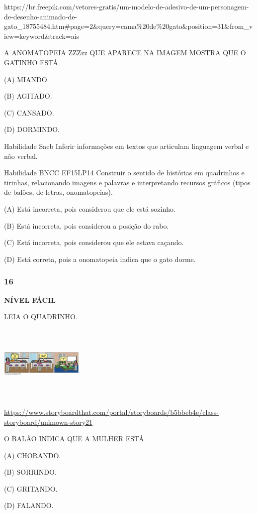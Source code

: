 https://br.freepik.com/vetores-gratis/um-modelo-de-adesivo-de-um-personagem-de-desenho-animado-de-gato\_18755484.htm\#page=2\&query=cama\%20de\%20gato\&position=31\&from\_view=keyword\&track=ais

A ANOMATOPEIA ZZZzz QUE APARECE NA IMAGEM MOSTRA QUE O GATINHO ESTÁ

(A) MIANDO.

(B) AGITADO.

(C) CANSADO.

(D) DORMINDO.

Habilidade Saeb Inferir informações em textos que articulam linguagem
verbal e não verbal.

Habilidade BNCC EF15LP14 Construir o sentido de histórias em quadrinhos
e tirinhas, relacionando imagens e palavras e interpretando recursos
gráficos (tipos de balões, de letras, onomatopeias).

(A) Está incorreta, pois considerou que ele está sozinho.

(B) Está incorreta, pois considerou a posição do rabo.

(C) Está incorreta, pois considerou que ele estava caçando.

(D) Está correta, pois a onomatopeia indica que o gato dorme.

\subsubsection{16}\label{section-126}

\textbf{NÍVEL FÁCIL}

LEIA O QUADRINHO.

\includegraphics[width=1.57333in,height=1.45456in]{media/image162.png}

\url{https://www.storyboardthat.com/portal/storyboards/b5bbeb4e/class-storyboard/unknown-story21}

O BALÃO INDICA QUE A MULHER ESTÁ

(A) CHORANDO.

(B) SORRINDO.

(C) GRITANDO.

(D) FALANDO.

